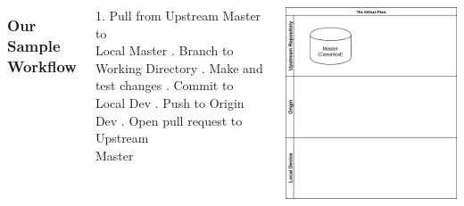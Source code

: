 \documentclass[unknownkeysallowed]{beamer}
\begin{document}
\begin{frame}
    \vspace{1cm} %
	\begin{columns}
		\column{2.5in}
    \frametitle{Our Sample Workflow}
        1. Pull from Upstream Master to \\
        Local Master \linebreak{}. Branch to Working Directory \linebreak{}. Make and test changes \linebreak{}. Commit to Local Dev \linebreak{}. Push to Origin Dev \linebreak{}. Open pull request to Upstream \\
        Master
	\column{2.25in}
	\begin{center}
	\includegraphics[width = .9\linewidth]{assets/gitflow1}
	\end{center}
	\end{columns}
    \vspace{1cm} %
\end{frame}
\end{document}
